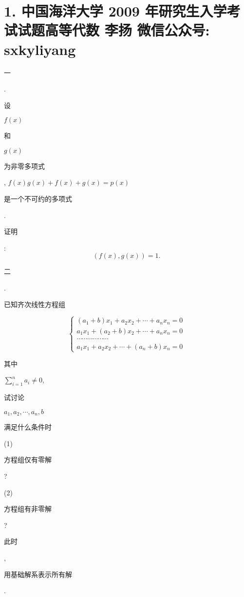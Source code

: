 \documentclass[10pt]{article}
\begin{document}
\section{1. 中国海洋大学 2009 年研究生入学考试试题高等代数 
 李扬 
 微信公众号: sxkyliyang}
\begin{CJK}{UTF8}{mj}一\end{CJK}. \begin{CJK}{UTF8}{mj}设\end{CJK} $f(x)$ \begin{CJK}{UTF8}{mj}和\end{CJK} $g(x)$ \begin{CJK}{UTF8}{mj}为非零多项式\end{CJK}, $f(x) g(x)+f(x)+g(x)=p(x)$ \begin{CJK}{UTF8}{mj}是一个不可约的多项式\end{CJK}. \begin{CJK}{UTF8}{mj}证明\end{CJK}:
$$
(f(x), g(x))=1 .
$$
\begin{CJK}{UTF8}{mj}二\end{CJK}. \begin{CJK}{UTF8}{mj}已知齐次线性方程组\end{CJK}
$$
\left\{\begin{array}{c}
\left(a_{1}+b\right) x_{1}+a_{2} x_{2}+\cdots+a_{n} x_{n}=0 \\
a_{1} x_{1}+\left(a_{2}+b\right) x_{2}+\cdots+a_{n} x_{n}=0 \\
\cdots \cdots \cdots \cdots \cdots \cdots \\
a_{1} x_{1}+a_{2} x_{2}+\cdots+\left(a_{n}+b\right) x_{n}=0
\end{array}\right.
$$
\begin{CJK}{UTF8}{mj}其中\end{CJK} $\sum_{i=1}^{n} a_{i} \neq 0$, \begin{CJK}{UTF8}{mj}试讨论\end{CJK} $a_{1}, a_{2}, \cdots, a_{n}, b$ \begin{CJK}{UTF8}{mj}满足什么条件时\end{CJK}

(1) \begin{CJK}{UTF8}{mj}方程组仅有零解\end{CJK}?

(2) \begin{CJK}{UTF8}{mj}方程组有非零解\end{CJK}? \begin{CJK}{UTF8}{mj}此时\end{CJK}, \begin{CJK}{UTF8}{mj}用基础解系表示所有解\end{CJK}.
\end{document}

